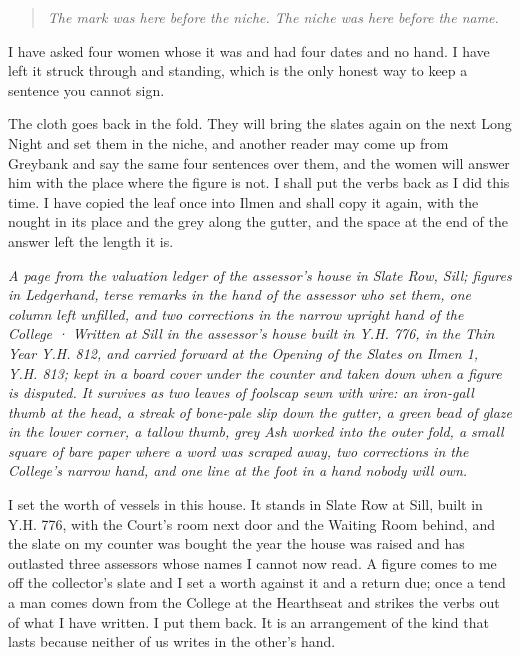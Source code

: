 \documentclass{design/chronicle}
\begin{document}
\begin{quote}\itshape The mark was here before the niche. The niche was here before the name.\end{quote}

I have asked four women whose it was and had four dates and no hand. I have left it struck through and standing, which is the only honest way to keep a sentence you cannot sign.

The cloth goes back in the fold. They will bring the slates again on the next Long Night and set them in the niche, and another reader may come up from Greybank and say the same four sentences over them, and the women will answer him with the place where the figure is not. I shall put the verbs back as I did this time. I have copied the leaf once into Ilmen and shall copy it again, with the nought in its place and the grey along the gutter, and the space at the end of the answer left the length it is.

\clearpage{}
{\centering\FellFont\itshape\footnotesize\color{faded} A page from the valuation ledger of the assessor’s house in Slate Row, Sill; figures in Ledgerhand, terse remarks in the hand of the assessor who set them, one column left unfilled, and two corrections in the narrow upright hand of the College · Written at Sill in the assessor’s house built in Y.H. 776, in the Thin Year Y.H. 812, and carried forward at the Opening of the Slates on Ilmen 1, Y.H. 813; kept in a board cover under the counter and taken down when a figure is disputed. It survives as two leaves of foolscap sewn with wire: an iron-gall thumb at the head, a streak of bone-pale slip down the gutter, a green bead of glaze in the lower corner, a tallow thumb, grey Ash worked into the outer fold, a small square of bare paper where a word was scraped away, two corrections in the College’s narrow hand, and one line at the foot in a hand nobody will own.\par}\medskip
I set the worth of vessels in this house. It stands in Slate Row at Sill, built in Y.H. 776, with the Court’s room next door and the Waiting Room behind, and the slate on my counter was bought the year the house was raised and has outlasted three assessors whose names I cannot now read. A figure comes to me off the collector’s slate and I set a worth against it and a return due; once a tend a man comes down from the College at the Hearthseat and strikes the verbs out of what I have written. I put them back. It is an arrangement of the kind that lasts because neither of us writes in the other’s hand.
\end{document}
